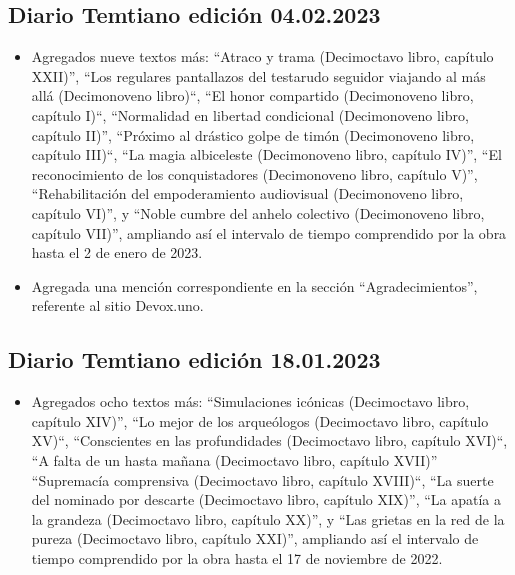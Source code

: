 \documentclass[
]{book}
\providecommand{\tightlist}{%
  \setlength{\itemsep}{0pt}\setlength{\parskip}{0pt}}
\begin{document}
\hypertarget{diario-temtiano-ediciuxf3n-04.02.2023}{%
\subsection*{Diario Temtiano edición 04.02.2023}\label{diario-temtiano-ediciuxf3n-04.02.2023}}

\begin{itemize}
\item
  Agregados nueve textos más: ``Atraco y trama (Decimoctavo libro, capítulo XXII)'', ``Los regulares pantallazos del testarudo seguidor viajando al más allá (Decimonoveno libro)``, ``El honor compartido (Decimonoveno libro, capítulo I)``, ``Normalidad en libertad condicional (Decimonoveno libro, capítulo II)'', ``Próximo al drástico golpe de timón (Decimonoveno libro, capítulo III)``, ``La magia albiceleste (Decimonoveno libro, capítulo IV)'', ``El reconocimiento de los conquistadores (Decimonoveno libro, capítulo V)'', ``Rehabilitación del empoderamiento audiovisual (Decimonoveno libro, capítulo VI)'', y ``Noble cumbre del anhelo colectivo (Decimonoveno libro, capítulo VII)'', ampliando así el intervalo de tiempo comprendido por la obra hasta el 2 de enero de 2023.
\item
  Agregada una mención correspondiente en la sección ``Agradecimientos'', referente al sitio Devox.uno.
\end{itemize}

\hypertarget{diario-temtiano-ediciuxf3n-18.01.2023}{%
\subsection*{Diario Temtiano edición 18.01.2023}\label{diario-temtiano-ediciuxf3n-18.01.2023}}

\begin{itemize}
\tightlist
\item
  Agregados ocho textos más: ``Simulaciones icónicas (Decimoctavo libro, capítulo XIV)'', ``Lo mejor de los arqueólogos (Decimoctavo libro, capítulo XV)``, ``Conscientes en las profundidades (Decimoctavo libro, capítulo XVI)``, ``A falta de un hasta mañana (Decimoctavo libro, capítulo XVII)'' ``Supremacía comprensiva (Decimoctavo libro, capítulo XVIII)``, ``La suerte del nominado por descarte (Decimoctavo libro, capítulo XIX)'', ``La apatía a la grandeza (Decimoctavo libro, capítulo XX)'', y ``Las grietas en la red de la pureza (Decimoctavo libro, capítulo XXI)'', ampliando así el intervalo de tiempo comprendido por la obra hasta el 17 de noviembre de 2022.
\end{itemize}
\end{document}
